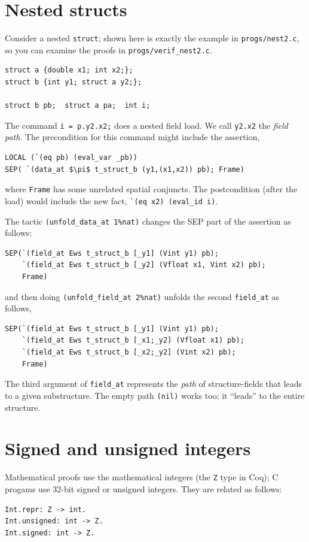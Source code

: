 \documentclass[12pt,fleqn,openany,oneside,showtrims]{memoir}
\newcommand{\ychapter}[2]{\chapter[#1]{#1 \hfill \normalsize #2}}
\begin{document}
\ychapter{Nested structs}{}
Consider a nested \lstinline{struct}; shown here is exactly the
example in \lstinline{progs/nest2.c}, so you can examine the proofs in
\lstinline{progs/verif_nest2.c}.
\begin{lstlisting}
struct a {double x1; int x2;};
struct b {int y1; struct a y2;};

struct b pb;  struct a pa;  int i;
\end{lstlisting}
The command  \lstinline{i = p.y2.x2;} does a nested field load.
We call \lstinline{y2.x2} the \emph{field path}.
The precondition for this command might include the assertion,
\begin{lstlisting}
LOCAL (`(eq pb) (eval_var _pb))
SEP( `(data_at $\pi$ t_struct_b (y1,(x1,x2)) pb); Frame)
\end{lstlisting}
where \lstinline{Frame} has some unrelated spatial conjuncts.
The postcondition (after the load) would include the new \LOCAL fact,
\lstinline{`(eq x2) (eval_id i)}.

The tactic \lstinline{(unfold_data_at 1%nat)}
changes the SEP part of the assertion as follows:
\begin{lstlisting}
SEP(`(field_at Ews t_struct_b [_y1] (Vint y1) pb);
    `(field_at Ews t_struct_b [_y2] (Vfloat x1, Vint x2) pb);
    Frame)
\end{lstlisting}
 and then doing \lstinline{(unfold_field_at 2%nat)}
unfolds the second \lstinline{field_at} as follows,
\begin{lstlisting}
SEP(`(field_at Ews t_struct_b [_y1] (Vint y1) pb);
    `(field_at Ews t_struct_b [_x1;_y2] (Vfloat x1) pb);
    `(field_at Ews t_struct_b [_x2;_y2] (Vint x2) pb);
    Frame)
\end{lstlisting}
The third argument of \lstinline{field_at} represents
the \emph{path} of structure-fields that leads to a given
substructure.  The empty path \lstinline{(nil)}
works too; it ``leads'' to the entire structure.

\ychapter{Signed and unsigned integers}{}

Mathematical proofs use the mathematical integers (the \lstinline{Z}
type in Coq); C progams use 32-bit signed or unsigned integers.
They are related as follows:

\begin{lstlisting}
Int.repr: Z -> int.
Int.unsigned: int -> Z.
Int.signed: int -> Z.
\end{lstlisting}
\end{document}
